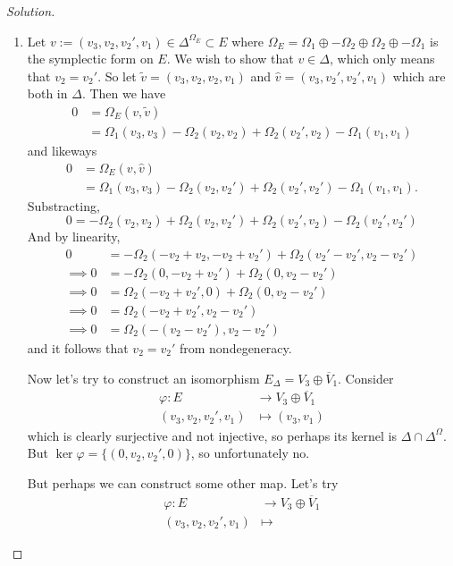 \begin{proof}[Solution]\leavevmode
	\begin{enumerate}[label=\alph*.]
		\item Let $v:=(v_3,v_2,v_2',v_1)\in \Delta^{\Omega_E}\subset E$ where  $\Omega_E=\Omega_1\oplus -\Omega_2\oplus \Omega_2\oplus -\Omega_1$ is the symplectic form on $E$. We wish to show that $v\in \Delta$, which only means that $v_2=v_2'$. So let $\tilde{v}=(v_3,v_2,v_2,v_1)$ and $\hat{v}=(v_3,v_2',v_2',v_1)$ which are both in $\Delta$. Then we have
			\begin{align*}
				0&=\Omega_E(v,\tilde{v})\\
				& =\Omega_1(v_3,v_3)-\Omega_2(v_2,v_2)+\Omega_{2}(v_2',v_2)-\Omega_{1}(v_1,v_1)
			\end{align*}
and likeways
			\begin{align*}
				0&=\Omega_E(v,\hat{v})\\
				& =\Omega_1(v_3,v_3)-\Omega_2(v_2,v_2')+\Omega_{2}(v_2',v_2')-\Omega_{1}(v_1,v_1).
			\end{align*}
Substracting,
\[0=-\Omega_2(v_2,v_2)+\Omega_2(v_2,v_2')+\Omega_2(v_2',v_2)-\Omega_2(v_2',v_2')\]
And by linearity,
\begin{align*}
0&=-\Omega_2(-v_2+v_2,-v_2+v_2')+\Omega_2(v_2'-v_2',v_2-v_2')\\
\implies 0&=-\Omega_2(0,-v_2+v_2')+\Omega_2(0,v_2-v_2')\\
\implies 0&=\Omega_2(-v_2+v_2',0)+\Omega_2(0,v_2-v_2') \\
\implies 0&=\Omega_2(-v_2+v_2',v_2-v_2')\\
\implies 0&=\Omega_2(-(v_2-v_2'),v_2-v_2')
\end{align*}
and it follows that $v_2=v_2'$ from nondegeneracy.

Now let's try to construct an isomorphism $E_{\Delta}=V_3\oplus \overline{V}_{1}$. Consider
\begin{align*}
	\varphi: E &\longrightarrow V_3\oplus \overline{V}_{1} \\
	(v_3,v_2,v_2',v_1) &\longmapsto (v_3,v_1)
\end{align*}
which is clearly surjective and not injective, so perhaps its kernel is $ \Delta \cap \Delta^{\Omega}$. But $\ker \varphi=\{(0,v_2,v_2',0)\}$, so unfortunately no.

But perhaps we can construct some other map. Let's try
\begin{align*}
	\varphi: E &\longrightarrow V_3\oplus \overline{V}_{1} \\
	(v_3,v_2,v_2',v_1) &\longmapsto 
\end{align*}


\end{enumerate}
\end{proof}
